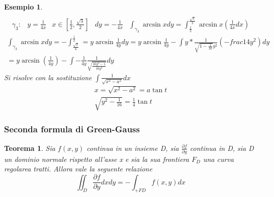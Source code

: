 \documentclass{book}
\newtheorem{teorema}{Teorema}
\newtheorem{esempio}{Esempio}
\begin{document}
\begin{esempio}
\begin{equation*}
\begin{matrix}
	\end{matrix}
\end{equation*}
\begin{equation*}
	\begin{matrix}
		\gamma_3: &y=\frac{1}{4x}& x\in \left[\frac{1}{2},
		\frac{\sqrt{3}}{2}\right] & dy=-\frac{1}{4x} & \int_{\gamma_3}\arcsin
		xdy=\int_{\frac{1}{2}}^{\frac{\sqrt{3}}{2}}\arcsin x
		\left(\frac{1}{4x}dx\right)
	\end{matrix}
\end{equation*}
\clearpage
\begin{equation*}
	\begin{matrix}
		\int_{\gamma_3}\arcsin x
		dy=-\int_{\frac{\sqrt{3}}{6}}^{\frac{1}{2}}=y\arcsin \frac{1}{4y}dy=
		y\arcsin \frac{1}{4y}-\int
		y*\frac{1}{\sqrt{1-\frac{1}{16}}y^2}\left(-frac{1}{4y^2}\right)dy\\
		=y\arcsin\left(\frac{1}{4y}\right)-\int-\frac{1}{4y}\frac{1}{\sqrt{\frac{16
		y^2-1}{16y^2}}}dy
	\end{matrix}
\end{equation*}
	Si risolve con la sostituzione $\int\frac{1}{\sqrt{x^2-a^2}}dx$ 
\begin{align*}
	x=\sqrt{x^2-a^2}=a\tan t\\
	\sqrt{y^2-\frac{1}{16}}=\frac{1}{4}\tan t
\end{align*}
\end{esempio}
\subsubsection{Seconda formula di Green-Gauss}
\begin{teorema}
	Sia $f(x,y)$ continua in un insieme D, sia $\frac{\partial f}{\partial y}$
	continua in D, sia D un dominio normale rispetto all'asse x e sia la sua
	frontiera $F_D$ una curva regolarea tratti. Allora vale la seguente
	relazione 
	\begin{equation}
		\iint_D \frac{\partial f}{\partial y} dxdy=-\int_{+FD} f(x,y) dx
	\end{equation}
\end{teorema}
\printindex
\end{document}
